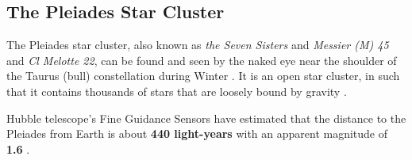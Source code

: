 \documentclass[12pt]{article}
\begin{document}
\subsection{The Pleiades Star Cluster} \label{sec:1.3}

The Pleiades star cluster, also known as \textit{the Seven Sisters} and \textit{Messier (M) 45} and \textit{Cl Melotte 22}, can be found and seen by the naked eye near the shoulder of the Taurus (bull) constellation during Winter
\cite{nasapleiades,hubblepleiades}.
It is an open star cluster, in such that it contains thousands of stars that are loosely bound by gravity \cite{nasapleiades}.

Hubble telescope's Fine Guidance Sensors have estimated that the distance to the Pleiades from Earth is about \textbf{440 light-years} \cite{hubblepleiades} 
with an apparent magnitude of \textbf{1.6} \cite{sedspleiades,frenchpleiades}.
\end{document}
